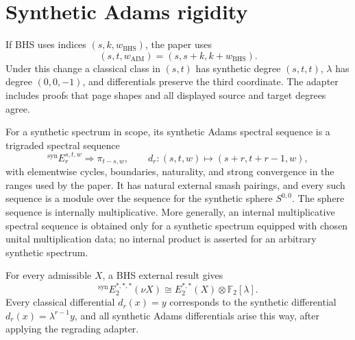 \section{Synthetic Adams rigidity}

\begin{definition}
  \label{def:bhs-aim-regrading}
  \notready
  If BHS uses indices $(s,k,w_{\mathrm{BHS}})$, the paper uses
  \[
    (s,t,w_{\mathrm{AIM}})=(s,s+k,k+w_{\mathrm{BHS}}).
  \]
  Under this change a classical class in $(s,t)$ has synthetic degree
  $(s,t,t)$, $\lambda$ has degree $(0,0,-1)$, and differentials preserve the
  third coordinate.  The adapter includes proofs that page shapes and all
  displayed source and target degrees agree.
\end{definition}

\begin{definition}
  \label{def:synthetic-adams-ss}
  \notready
  For a synthetic spectrum in scope, its synthetic Adams spectral sequence is
  a trigraded spectral sequence
  \[
    {}^{\mathrm{syn}}E_r^{s,t,w}\Longrightarrow\pi_{t-s,w},
    \qquad d_r:(s,t,w)\mapsto(s+r,t+r-1,w),
  \]
  with elementwise cycles, boundaries, naturality, and strong convergence in
  the ranges used by the paper.  It has natural external smash pairings, and
  every such sequence is a module over the sequence for the synthetic sphere
  $S^{0,0}$.  The sphere sequence is internally multiplicative.  More
  generally, an internal multiplicative spectral sequence is obtained only
  for a synthetic spectrum equipped with chosen unital multiplication data;
  no internal product is asserted for an arbitrary synthetic spectrum.
\end{definition}



\begin{theorem}
  \label{thm:external-synthetic-rigidity}
  \notready
  For every admissible $X$, a BHS external result gives
  \[
    {}^{\mathrm{syn}}E_2^{*,*,*}(\nu X)
      \cong E_2^{*,*}(X)\otimes\mathbb F_2[\lambda].
  \]
  Every classical differential $d_r(x)=y$ corresponds to the synthetic
  differential $d_r(x)=\lambda^{r-1}y$, and all synthetic Adams differentials
  arise this way, after applying the regrading adapter.
\end{theorem}

